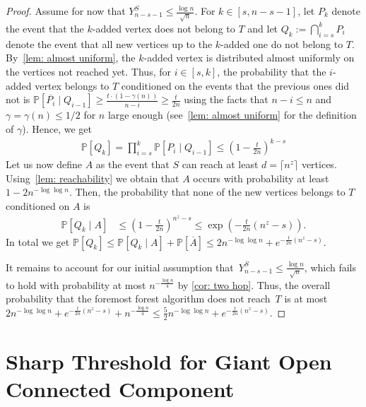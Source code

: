 \documentclass[a4paper,11pt]{article}
\theoremstyle{definition}
\theoremstyle{plain}
\newcommand{\prob}{\mathbb{P}}
\renewcommand{\Pr}{\prob}
\begin{document}
\begin{proof}
  Assume for now that $Y_{n-s-1}^S \leq \frac{\log n}{\sqrt{n}}$.
  For $k\in [s, n - s - 1]$, let $P_k$ denote the event that the $k$-added vertex does not belong to $T$ and let $Q_k:=\bigcap_{i=s}^k P_i$ denote the event that all new vertices up to the $k$-added one do not belong to $T$.
  By~\cref{lem: almost uniform}, the $k$-added vertex is distributed almost uniformly on the vertices not reached yet.
  Thus, for $i\in [s, k]$, the probability that the $i$-added vertex belongs to $T$ conditioned on the events that the previous ones did not is $\Pr[\overline{P_i} \mid Q_{i-1}]\ge \frac{t\cdot(1-\gamma(n))}{n - i}\ge \frac{t}{2n}$ using the facts that $n-i\le n$ and $\gamma=\gamma(n)\le 1/2$ for $n$ large enough (see~\cref{lem: almost uniform} for the definition of $\gamma$).
  Hence, we get
  \begin{align*}
    \Pr[Q_k]
    = \prod_{i=s}^k \Pr[P_i \mid Q_{i-1}]
    \le \left(1-\frac{t}{2n}\right)^{k - s}
  \end{align*}
  Let us now define $A$ as the event that
  $S$ can reach at least $d=\lceil n^z\rceil$ vertices. Using~\cref{lem: reachability} we obtain that $A$ occurs with probability at least $1-2n^{-\log \log n}$.
  Then, the probability that none of the new vertices belongs to $T$ conditioned on $A$ is
  \begin{align*}
    \Pr[Q_k \mid A]
    &\le \left(1-\frac{t}{2n}\right)^{n^z-s}
    \le \exp\left(-\frac{t}{2n}\left(n^z-s\right)\right).
  \end{align*}
  In total we get $\Pr[Q_k]\le \Pr[Q_k\mid A] + \Pr[\overline A]\le 2n^{-\log\log n} + e^{-\frac{t}{2n}(n^z-s)}$.
  
  It remains to account for our initial assumption that~$Y_{n-s-1}^S \leq \frac{\log n}{\sqrt{n}}$,
  which fails to hold with probability at most $n^{-\frac{\log{n}}{4}}$ by \cref{cor: two hop}.
  Thus, the overall probability that the foremost forest algorithm does not reach~$T$
  is at most $2n^{-\log\log n} + e^{-\frac{t}{2n}(n^z-s)} + n^{-\frac{\log{n}}{4}} \leq \frac{5}{2}n^{-\log\log n} + e^{-\frac{t}{2n}(n^z-s)}$.
\end{proof}



\section{Sharp Threshold for Giant Open Connected Component}
\label{sec:threshold}
\end{document}
